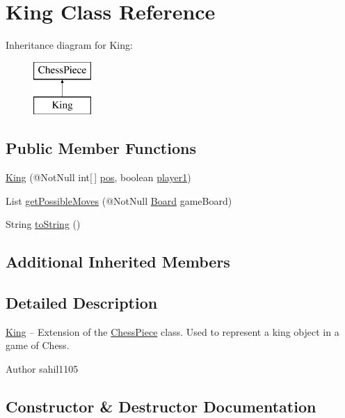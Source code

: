 \hypertarget{class_king}{}\section{King Class Reference}
\label{class_king}
Inheritance diagram for King\+:\begin{figure}[H]
\begin{center}
\leavevmode
\includegraphics[height=2.000000cm]{class_king}
\end{center}
\end{figure}
\subsection*{Public Member Functions}
\begin{DoxyCompactItemize}
\item 
\mbox{\hyperlink{class_king_ac379a344cfe95112dd01b1309f7e585c}{King}} (@Not\+Null int\mbox{[}$\,$\mbox{]} \mbox{\hyperlink{class_chess_piece_ae9f0da2b5fca2557eab359044a7ba1ac}{pos}}, boolean \mbox{\hyperlink{class_chess_piece_aa8711ff5ce8a45159b9b30c8148a34b2}{player1}})
\item 
List \mbox{\hyperlink{class_king_ac6fc988cceee3c181c0a341c76b7487e}{get\+Possible\+Moves}} (@Not\+Null \mbox{\hyperlink{class_board}{Board}} game\+Board)
\item 
String \mbox{\hyperlink{class_king_a68975ad02af5e0f0e1bdf19a67b14076}{to\+String}} ()
\end{DoxyCompactItemize}
\subsection*{Additional Inherited Members}


\subsection{Detailed Description}
\mbox{\hyperlink{class_king}{King}} -- Extension of the \mbox{\hyperlink{class_chess_piece}{Chess\+Piece}} class. Used to represent a king object in a game of Chess. \begin{DoxyAuthor}{Author}
sahil1105 
\end{DoxyAuthor}


\subsection{Constructor \& Destructor Documentation}
\mbox{\label{class_king_ac379a344cfe95112dd01b1309f7e585c}} 
